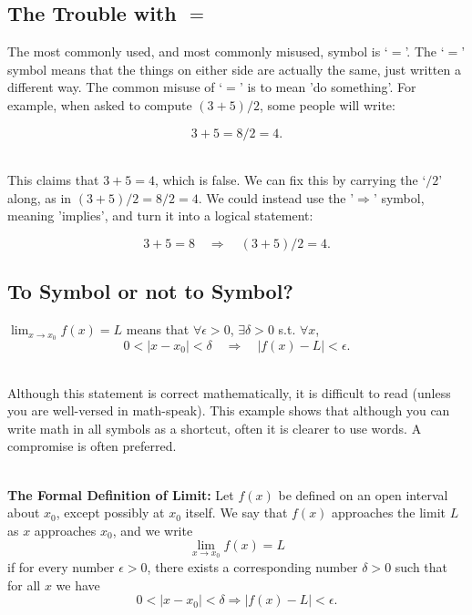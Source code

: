 \vfill
\secondpage

\subsection*{The Trouble with $=$}
The most commonly used, and most commonly misused, symbol is
`$=$'. The `$=$' symbol means that the things on either side are
actually the same, just written a different way. The common misuse of
`$=$' is to mean 'do something'. For example, when asked to compute
$(3+5)/2$, some people will write:\\
\begin{badexample}
\[
3+5=8/2=4.
\]
\end{badexample}\\
This claims that $3+5=4$, which is false. We can fix this by carrying
the `$/2$' along, as in $(3+5)/2=8/2=4$. We could instead use the
'$\Rightarrow$' symbol, meaning 'implies', and turn it into a logical
statement: \\
\begin{goodexample}
\[
3+5=8\quad \Rightarrow \quad (3+5)/2=4.
\]
\end{goodexample}

\subsection*{To Symbol or not to Symbol?}

\begin{badexample}
$\lim_{x \rightarrow x_0} f(x)=L$ means that $\forall \epsilon >0$,
$\exists \delta >0$ s.t. $\forall x$,
\[
0 < |x -x_0|< \delta\quad  \Rightarrow\quad |f(x)-L|<\epsilon.
\]
\end{badexample}\\
Although this statement is correct mathematically, it is difficult to
read (unless you are well-versed in math-speak).  This example shows
that although you can write math in all symbols as a shortcut, often
it is clearer to use words. A compromise is often preferred.\\
\begin{goodexample}\\
{\bf The Formal Definition of Limit:}
Let $f(x)$ be defined on an open interval about $x_0$, except possibly
at $x_0$ itself. We say that $f(x)$ approaches the limit $L$ as $x$
approaches $x_0$, and we write
\[
\lim_{x \rightarrow x_0} f(x)=L
\]
if for every number $\epsilon>0$, there exists a corresponding number
$\delta>0$ such that for all $x$ we have
\[
0 < |x -x_0|< \delta \Longrightarrow |f(x)-L|<\epsilon.
\]
\end{goodexample}%

